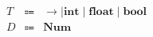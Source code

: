 \documentclass[12pt]{article}
\begin{document}
\pagestyle{empty}

\begin{align*}
    \begin{array}{rcl}
        T
        &\Coloneqq &{\to} \mid \mathbf{int} \mid \mathbf{float} \mid \mathbf{bool} \\
        D
        &\Coloneqq &\mathbf{Num}
    \end{array}
\end{align*}
\end{document}
